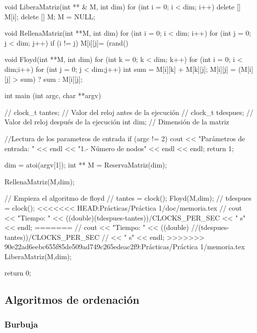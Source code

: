 \documentclass[12pt,spanish]{article}
\begin{document}
\begin{multicols}{2}
\begin{tcblisting}
void LiberaMatriz(int ** & M, int dim)
{
  for (int i = 0; i < dim; i++)
    delete [] M[i];
  delete [] M;
  M = NULL;
}		


void RellenaMatriz(int **M, int dim)
{
  for (int i = 0; i < dim; i++)
    for (int j = 0; j < dim; j++)
      if (i != j)
	M[i][j]= (rand() %
}			
	
void Floyd(int **M, int dim)
{
	for (int k = 0; k < dim; k++)
	  for (int i = 0; i < dim;i++)
	    for (int j = 0; j < dim;j++)
	      {
		int sum = M[i][k] + M[k][j];    	
	    	M[i][j] = (M[i][j] > sum) ? sum : M[i][j];
	      }
}	     	

int main (int argc, char **argv)
{
//  clock_t tantes;    // Valor del reloj antes de la ejecución
//  clock_t tdespues;  // Valor del reloj después de la ejecución
  int dim;           // Dimensión de la matriz

  //Lectura de los parametros de entrada
  if (argc != 2)
    {
      cout << "Parámetros de entrada: " << endl
	   << "1.- Número de nodos" << endl << endl;
      return 1;	
    }	

  dim = atoi(argv[1]);	
  int ** M = ReservaMatriz(dim);

  RellenaMatriz(M,dim);
		
			
  // Empieza el algoritmo de floyd
//  tantes = clock();
  Floyd(M,dim);
//  tdespues = clock();
<<<<<<< HEAD:Prácticas/Práctica 1/doc/memoria.tex
//  cout << "Tiempo: " << 
((double)(tdespues-tantes))/CLOCKS_PER_SEC 
<< " s" << endl;
=======
//  cout << "Tiempo: " << ((double)
//(tdespues-tantes))/CLOCKS_PER_SEC
// << " s" << endl;
>>>>>>> 90e22ad6eebc655f85de509ad749c265edeac2f9:Prácticas/Práctica 1/memoria.tex
  LiberaMatriz(M,dim);

  return 0;
}	
\end{tcblisting}
\end{multicols}
\newpage

\subsection{Algoritmos de ordenación}

\subsubsection{Burbuja}
\end{document}

